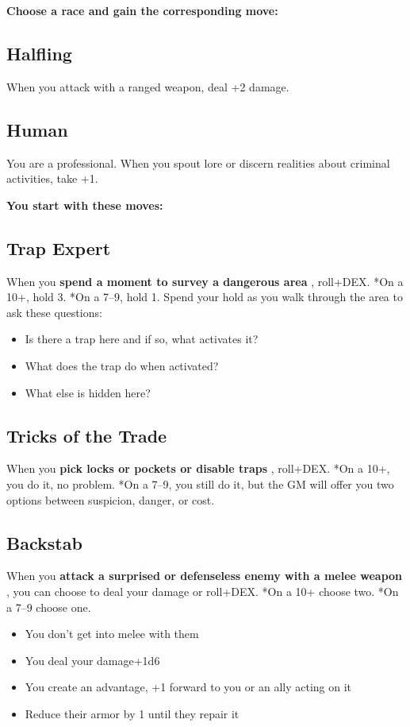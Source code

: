 {\bfseries Choose a race and gain the corresponding move:}
\subsection{Halfling}


 When you attack with a ranged weapon, deal +2 damage.
\subsection{Human}


 You are a professional. When you spout lore or discern realities about criminal activities, take +1.


\vspace{\baselineskip}
{\bfseries You start with these moves:}
\subsection{Trap Expert}


 When you \textbf{spend a moment to survey a dangerous area}
, roll+DEX. *On a 10+, hold 3. *On a 7--9, hold 1. Spend your hold as you walk through the area to ask these questions:
\begin{itemize}
\item Is there a trap here and if so, what activates it?
\item What does the trap do when activated?
\item What else is hidden here?

\end{itemize}
\subsection{Tricks of the Trade}


 When you \textbf{pick locks or pockets or disable traps}
, roll+DEX. *On a 10+, you do it, no problem. *On a 7--9, you still do it, but the GM will offer you two options between suspicion, danger, or cost.
\subsection{Backstab}


 When you \textbf{attack a surprised or defenseless enemy with a melee weapon}
, you can choose to deal your damage or roll+DEX. *On a 10+ choose two. *On a 7--9 choose one.
\begin{itemize}
\item You don't get into melee with them
\item You deal your damage+1d6
\item You create an advantage, +1 forward to you or an ally acting on it
\item Reduce their armor by 1 until they repair it

\end{itemize}
